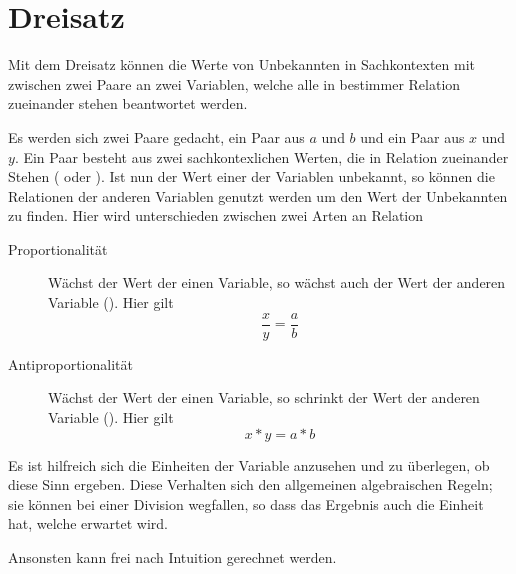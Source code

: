 \documentclass{article}
\begin{document}
\section{Dreisatz} 
Mit dem Dreisatz können die Werte von Unbekannten in Sachkontexten mit zwischen zwei Paare an zwei Variablen, welche alle in bestimmer Relation zueinander stehen beantwortet werden.

Es werden sich zwei Paare gedacht, ein Paar aus $a$ und $b$ und ein Paar aus $x$ und $y$. Ein Paar besteht aus zwei sachkontexlichen Werten, die in Relation zueinander Stehen (\zb {} oder ). Ist nun der Wert einer der Variablen unbekannt, so können die Relationen der anderen Variablen genutzt werden um den Wert der Unbekannten zu finden.
Hier wird unterschieden zwischen zwei Arten an Relation
\begin{description}
 \item[Proportionalität] Wächst der Wert der einen Variable, so wächst auch der Wert der anderen Variable (). Hier gilt
\[
 \frac{x}{y} = \frac{a}{b}
\]
 \item[Antiproportionalität] Wächst der Wert der einen Variable, so schrinkt der Wert der anderen Variable (). Hier gilt
\[
 x*y=a*b
\]
\end{description}
Es ist hilfreich sich die Einheiten der Variable anzusehen und zu überlegen, ob diese Sinn ergeben. Diese Verhalten sich den allgemeinen algebraischen Regeln; sie können bei einer Division wegfallen, so dass das Ergebnis auch die Einheit hat, welche erwartet wird.

Ansonsten kann frei nach Intuition gerechnet werden.
\end{document}
